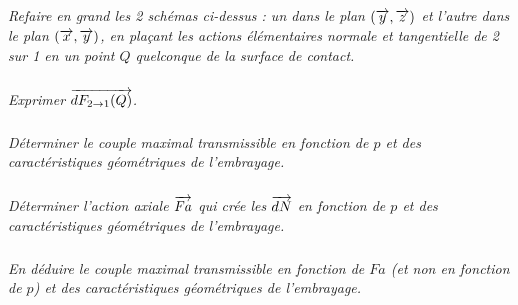 \documentclass[10pt]{article}
\begin{document}
\subparagraph{}
\textit{Refaire en grand les 2 schémas ci-dessus : un dans le plan $(\overrightarrow{y}, \overrightarrow{z})$ et l’autre dans le plan $(\overrightarrow{x}, \overrightarrow{y})$, en plaçant les actions élémentaires normale et tangentielle de 2 sur 1 en un point $Q$ quelconque de la surface de contact.}

\subparagraph{}
\textit{Exprimer $\overrightarrow{dF_{2\rightarrow 1}(Q)}$.}

\subparagraph{}
\textit{Déterminer le couple maximal transmissible en fonction de $p$ et des caractéristiques 
géométriques de l’embrayage.}

\subparagraph{}
\textit{Déterminer l’action axiale $\overrightarrow{Fa}$ qui crée les $\overrightarrow{dN}$ en fonction de $p$ et des caractéristiques géométriques de l’embrayage.}

\subparagraph{}
\textit{En déduire le couple maximal transmissible en fonction de $Fa$ (et non en fonction de $p$) et des caractéristiques géométriques de l’embrayage.}
\end{document}
